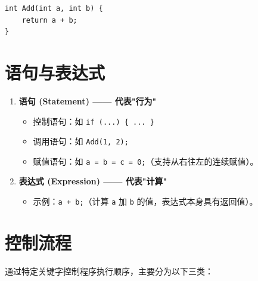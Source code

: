 \begin{lstlisting}[caption={源文件实现示例}]
int Add(int a, int b) { 
    return a + b; 
}
\end{lstlisting}

\section{语句与表达式}

\begin{enumerate}
    \item \textbf{语句 (Statement) —— 代表"行为"}
    \begin{itemize}
        \item 控制语句：如 \texttt{if (...) \{ ... \}}
        \item 调用语句：如 \texttt{Add(1, 2);}
        \item 赋值语句：如 \texttt{a = b = c = 0;}（支持从右往左的连续赋值）。
    \end{itemize}
    \item \textbf{表达式 (Expression) —— 代表"计算"}
    \begin{itemize}
        \item 示例：\texttt{a + b;}（计算 \texttt{a} 加 \texttt{b} 的值，表达式本身具有返回值）。
    \end{itemize}
\end{enumerate}

\newpage

\section{控制流程}

通过特定关键字控制程序执行顺序，主要分为以下三类：

